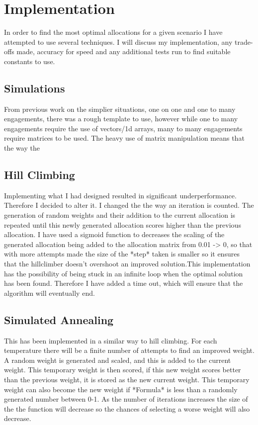 \chapter{Implementation} \label{Chapter:four}

In order to find the most optimal allocations for a given scenario I have attempted to use several techniques.  I will discuss my implementation, any trade-offs made, accuracy for speed and any additional tests run to find suitable constants to use.

\section{Simulations}

From previous work on the simplier situations, one on one and one to many engagements, there was a rough template to use, however while one to many engagements require the use of vectors/1d arrays, many to many engagements require matrices to be used. The heavy use of matrix manipulation means that the way the


\section{Hill Climbing}

Implementing what I had designed resulted in significant underperformance. Therefore I decided to alter it. I changed the the way an iteration is counted. The generation of random weights and their addition to the current allocation is repeated until this newly generated allocation scores higher than the previous allocation. I have used a sigmoid function to decreases the scaling of the generated allocation being added to the allocation matrix from 0.01 -> 0, so that with more attempts made the size of the *step* taken is smaller so it ensures that the hillclimber doesn't overshoot an improved solution.This implementation has the possibility of being stuck in an infinite loop when the optimal solution has been found. Therefore I have added a time out, which will ensure that the algorithm will eventually end.

\section{Simulated Annealing}

This has been implemented in a similar way to hill climbing. For each temperature there will be a finite number of attempts to find an improved weight. A random weight is generated and scaled, and this is added to the current weight. This temporary weight is then scored, if this new weight scores better than the previous weight, it is stored as the new current weight. This temporary weight can also become the new weight if *Formula* is less than a randomly generated number between 0-1. As the number of iterations increases the size of the the function will decrease so the chances of selecting a worse weight will also decrease.

